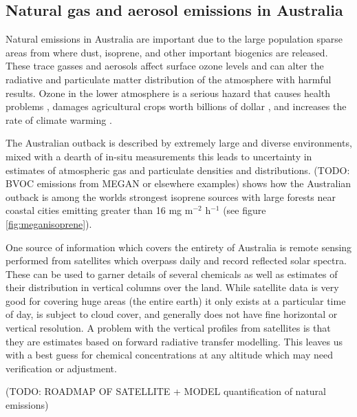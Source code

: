 \subsection{Natural gas and aerosol emissions in Australia}
Natural emissions in Australia are important due to the large population sparse areas from where dust, isoprene, and other important biogenics are released.
These trace gasses and aerosols affect surface ozone levels and can alter the radiative and particulate matter distribution of the atmosphere with harmful results.
Ozone in the lower atmosphere is a serious hazard that causes health problems \cite{Hsieh_2013}, damages agricultural crops worth billions of dollar \cite{Avnery_2011}, and increases the rate of climate warming \cite{IPCC_2013_chap8}. 

The Australian outback is described by extremely large and diverse environments, mixed with a dearth of in-situ measurements this leads to uncertainty in estimates of atmospheric gas and particulate densities and distributions.
(TODO: BVOC emissions from MEGAN or elsewhere examples)
\citet{Guenther_2006} shows how the Australian outback is among the worlds strongest isoprene sources with large forests near coastal cities emitting greater than 16 mg m$^{-2}$ h$^{-1}$ (see figure \ref{fig:meganisoprene}).

One source of information which covers the entirety of Australia is remote sensing performed from satellites which overpass daily and record reflected solar spectra.
These can be used to garner details of several chemicals as well as estimates of their distribution in vertical columns over the land.
While satellite data is very good for covering huge areas (the entire earth) it only exists at a particular time of day, is subject to cloud cover, and generally does not have fine horizontal or vertical resolution.
A problem with the vertical profiles from satellites is that they are estimates based on forward radiative transfer modelling.
This leaves us with a best guess for chemical concentrations at any altitude which may need verification or adjustment.


(TODO: ROADMAP OF SATELLITE + MODEL quantification of natural emissions)



  
  
  